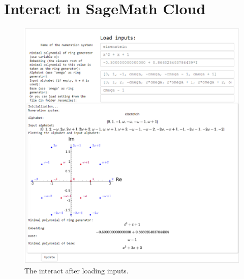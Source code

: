 

\section{Interact in SageMath Cloud}
\label{app:interact}
\begin{figure}[!htbp]
  \centering
  \includegraphics[width=\textwidth]{img/interact1.png}
  \caption{The interact after loading inputs.}
  \label{fig:interact1}
\end{figure}

